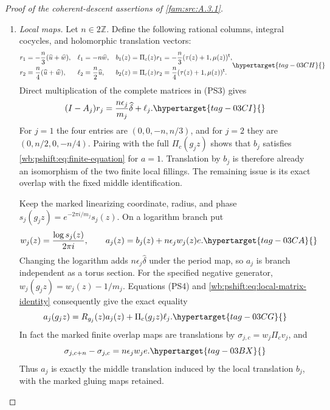 \begin{proof}[Proof of the coherent-descent assertions of \cref{fam:src:A.3.1}]
\begin{enumerate}[label=\arabic*.,leftmargin=*]
\item \emph{Local maps.}
Let $n\in2\mathbb Z$. Define the following rational columns,
integral cocycles, and holomorphic translation vectors:
\begin{equation}
\begin{aligned}
 r_1&=-\frac n3(\widehat u+\widehat w),&
 \ell_1&=-n\widehat w,&
 b_1(z)&=\Pi_c(z)r_1=-\frac n3(\tau(z)+1,\mu(z))^{\mathsf t},\\
 r_2&= \frac n4(\widehat u+\widehat w),&
 \ell_2&=\frac n2\widehat u,&
 b_2(z)&=\Pi_c(z)r_2=\frac n4(\tau(z)+1,\mu(z))^{\mathsf t}.
\end{aligned}
\hypertarget{tag-03CH}{}\label{wb:pshift:eq:local-corrections}
\end{equation}
Direct multiplication of the complete matrices in (PS3) gives
\begin{equation}
 (I-A_j)r_j=\frac{n\epsilon_j}{m_j}\widehat\delta+\ell_j.
 \hypertarget{tag-03CI}{}\label{wb:pshift:eq:local-matrix-identity}
\end{equation}
For $j=1$ the four entries are $(0,0,-n,n/3)$, and for $j=2$
they are $(0,n/2,0,-n/4)$. Pairing with the full $\Pi_c(g_jz)$
shows that $b_j$ satisfies \eqref{wb:pshift:eq:finite-equation} for $a=1$.
Translation by $b_j$ is therefore already an isomorphism of the
two finite local fillings. The remaining issue is its exact overlap
with the fixed middle identification.

Keep the marked linearizing coordinate, radius, and phase
$s_j(g_jz)=e^{-2\pi i/m_j}s_j(z)$. On a logarithm branch put
\begin{equation}
 w_j(z)=\frac{\log s_j(z)}{2\pi i},\qquad
 a_j(z)=b_j(z)+n\epsilon_j w_j(z)e.
 \hypertarget{tag-03CA}{}\label{wb:pshift:eq:finite-middle-sections}
\end{equation}
Changing the logarithm adds $n\epsilon_j\widehat\delta$ under the
period map, so $a_j$ is branch independent as a torus section.
For the specified negative generator, $w_j(g_jz)=w_j(z)-1/m_j$.
Equations (PS4) and \eqref{wb:pshift:eq:local-matrix-identity} consequently give the exact equality
\begin{equation}
 a_j(g_jz)=R_{g_j}(z)a_j(z)+\Pi_c(g_jz)\ell_j.
 \hypertarget{tag-03CG}{}\label{wb:pshift:eq:local-affine-cocycle}
\end{equation}
In fact the marked finite overlap maps are translations by
$\sigma_{j,c}=w_j\Pi_c v_j$, and
\begin{equation}
                  \sigma_{j,c+n}-\sigma_{j,c}
                     =n\epsilon_jw_je.
 \hypertarget{tag-03BX}{}\label{wb:pshift:eq:actual-overlap-difference}
\end{equation}
Thus $a_j$ is exactly the middle translation induced by the local
translation $b_j$, with the marked gluing maps retained.


\end{enumerate}
\end{proof}
